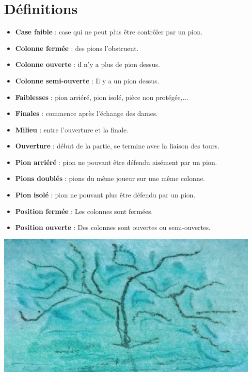 
\chapter{Définitions}


\begin{itemize}[leftmargin=1.7cm, label=, itemsep=5pt]%
\item  {\bf Case faible} : case qui ne peut plus être contrôler par un pion.
\item  {\bf Colonne fermée} : des pions l'obstruent.
\item  {\bf Colonne ouverte} : il n'y a plus de pion dessus.
\item  {\bf Colonne semi-ouverte} : Il y a un pion dessus.
\item  {\bf Faiblesses} : pion arriéré, pion isolé, pièce non protégée,...
\item  {\bf Finales} : commence après l'échange des dames.
\item  {\bf Milieu} : entre l'ouverture et la finale. 
\item  {\bf Ouverture} : début de la partie, se termine avec la liaison des tours.
\item  {\bf Pion arriéré} : pion ne pouvant être défendu aisément par un pion.
\item  {\bf Pions doublés} : pions du même joueur sur une même colonne.
\item  {\bf Pion isolé} : pion ne pouvant plus être défendu par un pion.
\item  {\bf Position fermée} : Les colonnes sont fermées.
\item  {\bf Position ouverte} : Des colonnes sont ouvertes ou semi-ouvertes.
\end{itemize}

\vfill

\begin{center}
\includegraphics[scale=2.1]{./image/arbre}
\end{center}

\vfill

